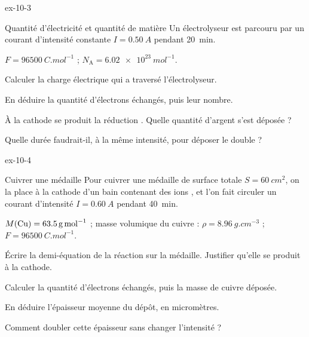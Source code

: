 \begin{blocLivre}{ex-10-3}
\begin{exercice}[1]{Quantité d'électricité et quantité de matière}
Un électrolyseur est parcouru par un courant d'intensité constante $I=\qty{0,50}{A}$ pendant 20~min.
\begin{donnees}
$F=\qty{96500}{C.mol^{-1}}$ ; $N_\mathrm{A}=\qty{6,02e23}{mol^{-1}}$.
\end{donnees}
\begin{questions}
\item Calculer la charge électrique qui a traversé l'électrolyseur.
\item En déduire la quantité d'électrons échangés, puis leur nombre.
\item À la cathode se produit la réduction . Quelle quantité d'argent s'est déposée ?
\item Quelle durée faudrait-il, à la même intensité, pour déposer le double ?
\end{questions}
\end{exercice}
\end{blocLivre}
\begin{blocLivre}{ex-10-4}
\begin{exercice}[1]{Cuivrer une médaille}
Pour cuivrer une médaille de surface totale $S=\qty{60}{cm^2}$, on la place à la cathode d'un bain contenant des ions
, et l'on fait circuler un courant d'intensité $I=\qty{0,60}{A}$ pendant 40~min.
\begin{donnees}
$M(\ce{Cu})=\qty{63,5}{g.mol^{-1}}$ ; masse volumique du cuivre : $\rho=\qty{8,96}{g.cm^{-3}}$ ;
$F=\qty{96500}{C.mol^{-1}}$.
\end{donnees}
\begin{questions}
\item Écrire la demi-équation de la réaction sur la médaille. Justifier qu'elle se produit à la cathode.
\item Calculer la quantité d'électrons échangés, puis la masse de cuivre déposée.
\item En déduire l'épaisseur moyenne du dépôt, en micromètres.
\item Comment doubler cette épaisseur sans changer l'intensité ?
\end{questions}
\end{exercice}
\end{blocLivre}
